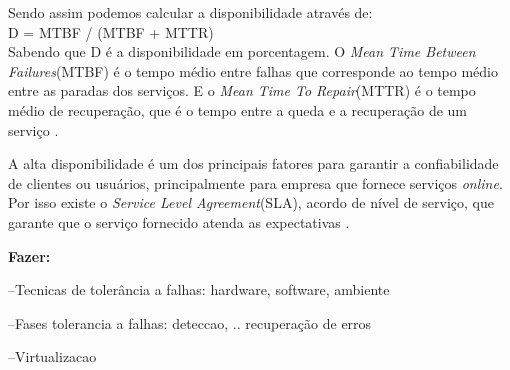 Sendo assim podemos calcular a disponibilidade através de:\\
D = MTBF / (MTBF + MTTR)\\
Sabendo que D é a disponibilidade em porcentagem. O \textit{Mean Time Between Failures}(MTBF) é o tempo médio entre falhas que corresponde
ao tempo médio entre as paradas dos serviços. E o \textit{Mean Time To Repair}(MTTR) é o tempo médio de recuperação, que é o tempo 
entre a queda e a recuperação de um serviço \cite{goncalves2009}.

A alta disponibilidade é um dos principais fatores para garantir a confiabilidade de clientes ou usuários, principalmente para empresa que 
fornece serviços \textit{online}. Por isso existe o \textit{Service Level Agreement}(SLA), acordo de nível de serviço, 
que garante que o serviço fornecido atenda as expectativas \cite{smith2010}.

\textbf{Fazer:} 

--Tecnicas de tolerância a falhas: hardware, software, ambiente

--Fases tolerancia a falhas: deteccao, .. recuperação de erros

--Virtualizacao
